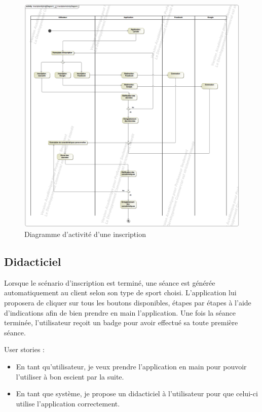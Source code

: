 \begin{figure}[!h]
\includegraphics[scale=0.3]{diagrams/inscription}
\centering
\caption{Diagramme d'activité d'une inscription}
\end{figure}

\subsection*{Didacticiel}

Lorsque le scénario d'inscription est terminé, une séance est générée automatiquement au client selon son type de sport choisi. L'application lui proposera de cliquer sur tous les boutons disponibles, étapes par étapes à l'aide d'indications afin de bien prendre en main l'application. Une fois la séance terminée, l'utilisateur reçoit un badge pour avoir effectué sa toute première séance.\\


\begin{itshape}

User stories :

\begin{itemize}
\item En tant qu'utilisateur, je veux prendre l'application en main pour pouvoir l'utiliser à bon escient par la suite.
\item En tant que système, je propose un didacticiel à l'utilisateur pour que celui-ci utilise l'application correctement.
\end{itemize}

\end{itshape}

